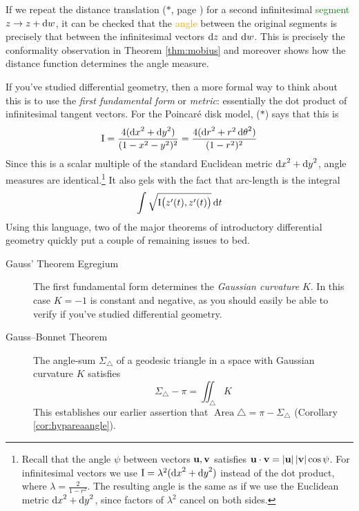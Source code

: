 \goodbreak

\label{pg:hypareaext}

If we repeat the distance translation ($\ast$, page \pageref{pg:hyp1stform}) for a second infinitesimal \textcolor{Green}{segment} $z\to z+{\mathrm{d} w}$, it can be checked that the \textcolor{orange}{angle} between the original segments is precisely that between the infinitesimal vectors ${\mathrm{d} z}$ and ${\mathrm{d} w}$. This is precisely the conformality observation in Theorem \ref{thm:mobius} and moreover shows how the distance function determines the angle measure.\smallbreak

If you've studied differential geometry, then a more formal way to think about this is to use the \emph{first fundamental form} or \emph{metric}: essentially the dot product of infinitesimal tangent vectors. For the Poincaré disk model, ($\ast$) says that this is
\[
	\mathrm{I} =\frac{4({\mathrm{d} x}^2+{\mathrm{d} y}^2)}{(1-x^2-y^2)^2} =\frac{4({\mathrm{d} r}^2+r^2\,{\mathrm{d}\theta}^2)}{(1-r^2)^2} 
\]
Since this is a scalar multiple of the standard Euclidean metric ${\mathrm{d} x}^2+{\mathrm{d} y}^2$, angle measures are identical.\footnote{%
	Recall that the angle $\psi$ between vectors ${\mathbf{u}},{\mathbf{v}}$ satisfies ${\mathbf{u}}\cdot{\mathbf{v}}=\left| {\mathbf{u}}\right|\left| {\mathbf{v}}\right|\cos\psi$. For infinitesimal vectors we use $\mathrm{I}=\lambda^2({\mathrm{d} x}^2+{\mathrm{d} y}^2)$ instead of the dot product, where $\lambda=\frac 2{1-r^2}$. The resulting angle is the same as if we use the Euclidean metric ${\mathrm{d} x}^2+{\mathrm{d} y}^2$, since factors of $\lambda^2$ cancel on both sides.
}
It also gels with the fact that arc-length is the integral
\[
	\int\sqrt{\mathrm{I}\bigl(z'(t),z'(t)\bigr)}\,{\mathrm{d} t}
\]
Using this language, two of the major theorems of introductory differential geometry quickly put a couple of remaining issues to bed.
\begin{description}
	\item[Gauss' Theorem Egregium] The first fundamental form determines the \emph{Gaussian curvature} $K$. In this case $K=-1$ is constant and negative, as you should easily be able to verify if you've studied differential geometry.
	\item[Gauss--Bonnet Theorem] The angle-sum $\Sigma_\triangle$ of a geodesic triangle in a space with Gaussian curvature $K$ satisfies
	\[
		\Sigma_\triangle-\pi=\iint_\triangle K
	\]
	This establishes our earlier assertion that $\operatorname{Area}\triangle =\pi-\Sigma_\triangle$ (Corollary \ref{cor:hypareaangle}).
\end{description}

